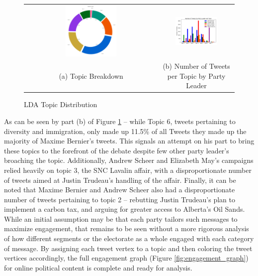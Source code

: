 \begin{figure}[h!]
  \centering
  \begin{tabular}{cc}
    \includegraphics[width=0.40\textwidth]{Figures/topic_distribution} &
    \includegraphics[width=0.60\textwidth]{Figures/grouped_bar_by_pl_topic} \\
  (a) Topic Breakdown & (b) Number of Tweets per Topic by Party Leader \\[6pt]
  \end{tabular}
  \caption[LDA Topic Distribution]{LDA Topic Distribution}
  \label{fig:topic_distribution}
\end{figure}

As can be seen by part (b) of Figure \ref{fig:topic_distribution} -- while Topic
6, tweets pertaining to diversity and immigration, only made up 11.5\% of all
Tweets they made up the majority of Maxime Bernier's tweets. This signals an
attempt on his part to bring these topics to the forefront of the debate despite
few other party leader's broaching the topic. Additionally, Andrew Scheer and
Elizabeth May's campaigns relied heavily on topic 3, the SNC Lavalin affair,
with a disproportionate number of tweets aimed at Justin Trudeau's handling of
the affair. Finally, it can be noted that Maxime Bernier and Andrew Scheer also
had a disproportionate number of tweets pertaining to topic 2 -- rebutting
Justin Trudeau's plan to implement a carbon tax, and arguing for greater access
to Alberta's Oil Sands. While an initial assumption may be that each party
tailors such messages to maximize engagement, that remains to be seen without a
more rigorous analysis of how different segments or the electorate as a whole
engaged with each category of message. By assigning each tweet vertex to a topic
and then coloring the tweet vertices accordingly, the full engagement graph
(Figure \ref{fig:engagement_graph}) for online political content is complete and
ready for analysis. 

